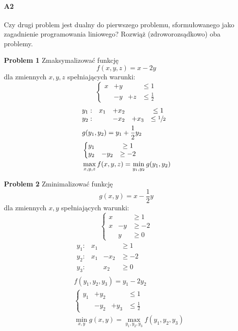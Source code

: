 \documentclass[a4paper,12pt]{article}
\theoremstyle{definition}%
\theoremstyle{definition}
\theoremstyle{problem}
\begin{document}
\paragraph{A2} Czy drugi problem jest dualny do pierwszego problemu, sformułowanego jako zagadnienie programowania liniowego? Rozwiąż (zdroworozsądkowo) oba problemy.

\begin{minipage}{.5\textwidth}
\textbf{Problem 1} Zmaksymalizować funkcję
$$f(x, y, z) = x - 2y$$
dla zmiennych $x, y, z$ spełniających warunki:
$$\left\{\begin{matrix}
x &+ y &&\leq 1\\
&-y &+ z &\leq \frac{1}{2}
\end{matrix}\right.$$
\begin{align*}
&\begin{matrix}
y_1: & x_1 &+x_2& &\leq 1\\
y_2: & &-x_2&+x_3 &\leq \sfrac{1}{2}
\end{matrix}\\
&g(y_1,y_2)=y_1+\frac{1}{2}y_2\\
&\left\{\begin{matrix}
y_1&&\geq 1\\
y_2&-y_2&\geq -2
\end{matrix}\right.\\
&\max _{x,y,z}f(x,y,z)=\min _{y_1,y_2}g(y_1,y_2)
\end{align*}
\end{minipage}%
\begin{minipage}{.5\textwidth}
\textbf{Problem 2} Zminimalizować funkcję
$$g(x, y) = x - \frac{1}{2}y$$
dla zmiennych $x, y$ spełniających warunki:
$$\left\{\begin{matrix}
x &&\geq 1\\
x &- y &\geq -2\\
&y &\geq 0
\end{matrix}\right.$$
\begin{align*}
&\begin{matrix}
y_1: & x_1 & &\geq 1\\
y_2: & x_1 &-x_2 &\geq -2\\
y_3: & & x_2 &\geq 0
\end{matrix}\\
&f(y_1,y_2,y_3)=y_1-2y_2\\
&\left\{\begin{matrix}
y_1	&+y_2	&		&\leq 1\\
&-y_2	&+y_3	&\leq \frac{1}{2}
\end{matrix}\right.\\
&\min _{x,y}g(x,y)=\max _{y_1,y_2,y_3}f(y_1,y_2,y_3)
\end{align*}
\end{minipage}
\end{document}
